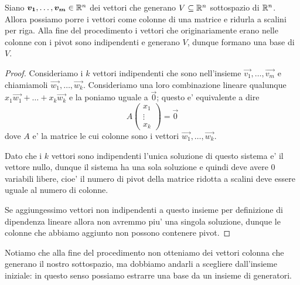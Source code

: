 \begin{proposition}\label{estrarre_una_base}
    Siano $\bm{v_1}, \dots, \bm{v_m} \in \mathbb{R}^n$ dei vettori che generano $V \subseteq \mathbb{R}^n$ sottospazio di $\mathbb{R}^n$. Allora possiamo porre i vettori come colonne di una matrice e ridurla a scalini per riga. Alla fine del procedimento i vettori che originariamente erano nelle colonne con i pivot sono indipendenti e generano $V$, dunque formano una base di $V$.
\end{proposition}
\begin{proof}
    Consideriamo i $k$ vettori indipendenti che sono nell'insieme $\vec{v_1}, \dots, \vec{v_m}$ e chiamiamoli $\vec{w_1}, \dots, \vec{w_k}$.
    Consideriamo una loro combinazione lineare qualunque $x_1\vec{w_1} + \dots + x_k\vec{w_k}$ e la poniamo uguale a $\vec{0}$; questo e' equivalente a dire \[
        A\begin{pmatrix}
            x_1 \\ \vdots \\ x_k
        \end{pmatrix} = \vec{0}
    \] dove $A$ e' la matrice le cui colonne sono i vettori $\vec{w_1}, \dots, \vec{w_k}$. 
    
    Dato che i $k$ vettori sono indipendenti l'unica soluzione di questo sistema e' il vettore nullo, dunque il sistema ha una sola soluzione e quindi deve avere $0$ variabili libere, cioe' il numero di pivot della matrice ridotta a scalini deve essere uguale al numero di colonne.

    Se aggiungessimo vettori non indipendenti a questo insieme per definizione di dipendenza lineare allora non avremmo piu' una singola soluzione, dunque le colonne che abbiamo aggiunto non possono contenere pivot.
\end{proof}

Notiamo che alla fine del procedimento non otteniamo dei vettori colonna che generano il nostro sottospazio, ma dobbiamo andarli a scegliere dall'insieme iniziale: in questo senso possiamo estrarre una base da un insieme di generatori.


